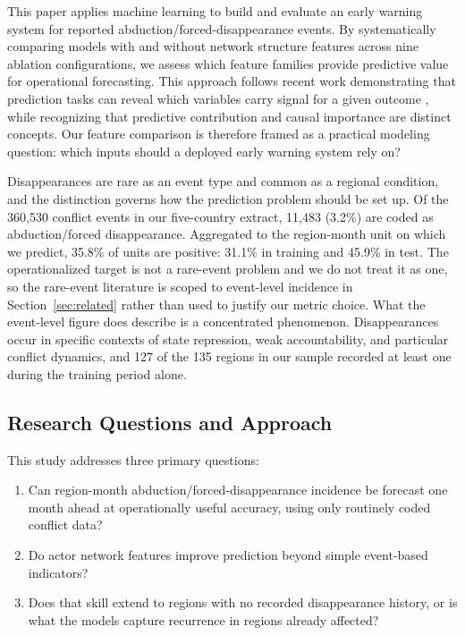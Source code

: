 \documentclass[pdflatex,sn-mathphys-num]{sn-jnl}%
\theoremstyle{thmstyleone}%
\theoremstyle{thmstyletwo}%
\theoremstyle{thmstylethree}%
\begin{document}
This paper applies machine learning to build and evaluate an early warning system for reported abduction/forced-disappearance events. By systematically comparing models with and without network structure features across nine ablation configurations, we assess which feature families provide predictive value for operational forecasting. This approach follows recent work demonstrating that prediction tasks can reveal which variables carry signal for a given outcome \cite{salganik2020measuring,hofman2021integrating}, while recognizing that predictive contribution and causal importance are distinct concepts. Our feature comparison is therefore framed as a practical modeling question: which inputs should a deployed early warning system rely on?

Disappearances are rare as an event type and common as a regional condition, and the distinction governs how the prediction problem should be set up. Of the 360,530 conflict events in our five-country extract, 11,483 (3.2\%) are coded as abduction/forced disappearance. Aggregated to the region-month unit on which we predict, 35.8\% of units are positive: 31.1\% in training and 45.9\% in test. The operationalized target is not a rare-event problem and we do not treat it as one, so the rare-event literature is scoped to event-level incidence in Section~\ref{sec:related} rather than used to justify our metric choice. What the event-level figure does describe is a concentrated phenomenon. Disappearances occur in specific contexts of state repression, weak accountability, and particular conflict dynamics, and 127 of the 135 regions in our sample recorded at least one during the training period alone.

\subsection{Research Questions and Approach}

This study addresses three primary questions:

\begin{enumerate}
    \item Can region-month abduction/forced-disappearance incidence be forecast one month ahead at operationally useful accuracy, using only routinely coded conflict data?
    
    \item Do actor network features improve prediction beyond simple event-based indicators?
    
    \item Does that skill extend to regions with no recorded disappearance history, or is what the models capture recurrence in regions already affected?
\end{enumerate}
\end{document}
